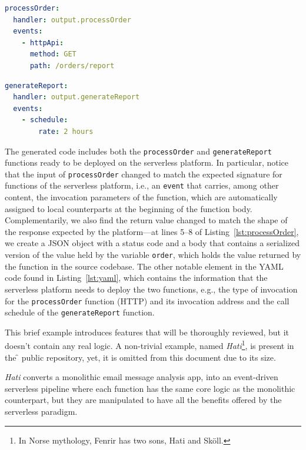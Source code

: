 \begin{minipage}{\textwidth}
\begin{minipage}[t]{.5\textwidth}
\begin{lstlisting}[language=yaml]
processOrder:
  handler: output.processOrder 
  events:
    - httpApi: 
      method: GET
      path: /orders/report
\end{lstlisting}
\end{minipage}
\begin{minipage}[t]{.5\textwidth}
\begin{lstlisting}[language=yaml,firstnumber=last]
generateReport:
  handler: output.generateReport
  events:
    - schedule:
        rate: 2 hours
\end{lstlisting}
\end{minipage}
\end{minipage}

The generated code includes both the \verb|processOrder| and \verb|generateReport| functions ready to
be deployed on the serverless platform. In particular, notice that the input of
\verb|processOrder| changed to match the expected signature for functions of
the serverless platform, i.e., an \verb|event| that carries, among other
content, the invocation parameters of the function, which are automatically
assigned to local counterparts at the beginning of the function body.
Complementarily, we also find the return value changed to match the shape of the
response expected by the platform---at lines 5--8 of
Listing~\ref{lst:processOrder}, we create a JSON object with a status code and a
body that contains a serialized version of the value held by the variable
\verb|order|, which holds the value returned by the function in the source
codebase.
The other notable element in the YAML code found in
Listing~\ref{lst:yaml}, which contains the information that the serverless
platform needs to deploy the two functions, e.g., the type of invocation for the
\verb|processOrder| function (HTTP) and its invocation address and the call
schedule of the \verb|generateReport| function.

This brief example introduces features that will be thoroughly reviewed,
but it doesn't contain any real logic.
A non-trivial example, named \textit{Hati}\footnote{In Norse mythology, Fenrir has two sons, Hati and Sköll.},
is present in the \f{} public repository, yet, it is omitted from this document due to its size.

\textit{Hati} converts a monolithic email message analysis app,
into an event-driven serverless pipeline where each function
has the same core logic as the monolithic counterpart, but they are manipulated to have
all the benefits offered by the serverless paradigm.

